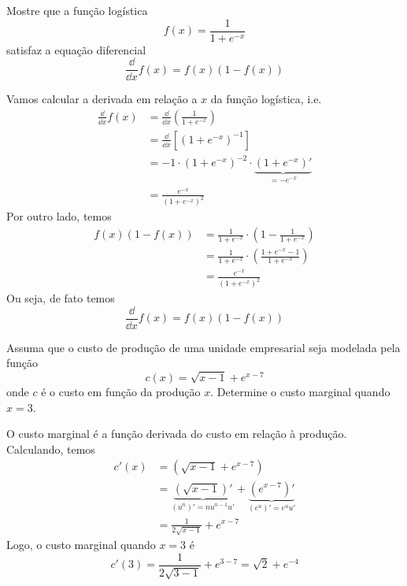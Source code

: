 \cleardoublepage\documentclass[../main.tex]{subfiles}
\begin{document}
\begin{exeresol}
  Mostre que a função logística
  \begin{equation*}
    f(x) = \frac{1}{1+e^{-x}}
  \end{equation*}
  satisfaz a equação diferencial
  \begin{equation*}
    \frac{\dd}{\dd x}f(x) = f(x)(1-f(x))
  \end{equation*}
\end{exeresol}
\begin{resol}
  Vamos calcular a derivada em relação a $x$ da função logística, i.e.
  \begin{align*}
    \frac{\dd}{\dd x}f(x) &= \frac{\dd}{\dd x}\left(\frac{1}{1+e^{-x}}\right) \\
          &= \frac{\dd}{\dd x}\left[\left(1+e^{-x}\right)^{-1}\right] \\
          &= -1\cdot\left(1+e^{-x}\right)^{-2}\cdot\underbrace{\left(1+e^{-x}\right)'}_{=-e^{-x}} \\
          &= \frac{e^{-x}}{\left(1+e^{-x}\right)^{2}}
  \end{align*}
  Por outro lado, temos
  \begin{align*}
    f(x)(1-f(x)) &= \frac{1}{1+e^{-x}}\cdot\left(1 - \frac{1}{1+e^{-x}}\right) \\
                 &= \frac{1}{1+e^{-x}}\cdot\left(\frac{1+e^{-x}-1}{1+e^{-x}}\right) \\
                 &= \frac{e^{-x}}{\left(1+e^{-x}\right)^{2}}
  \end{align*}
  Ou seja, de fato temos
  \begin{equation*}
    \frac{\dd}{\dd x}f(x) = f(x)(1-f(x))
  \end{equation*}  
\end{resol}

\begin{exeresol}
  Assuma que o custo de produção de uma unidade empresarial seja modelada pela função
  \begin{equation*}
    c(x) = \sqrt{x-1} + e^{x-7}
  \end{equation*}
  onde $c$ é o custo em função da produção $x$. Determine o custo marginal quando $x=3$.
\end{exeresol}
\begin{resol}
  O custo marginal é a função derivada do custo em relação à produção. Calculando, temos
  \begin{align*}
    c'(x) &= \left(\sqrt{x-1} + e^{x-7}\right)\\
          &= \underbrace{\left(\sqrt{x-1}\right)'}_{(u^n)' = nu^{n-1}u'} + \underbrace{\left(e^{x-7}\right)'}_{(e^u)' = e^uu'}\\
          &= \frac{1}{2\sqrt{x-1}} + e^{x-7}
  \end{align*}
  Logo, o custo marginal quando $x=3$ é
  \begin{equation*}
    c'(3) = \frac{1}{2\sqrt{3-1}} + e^{3-7} = \sqrt{2} + e^{-4}
  \end{equation*}
\end{resol}
\end{document}
